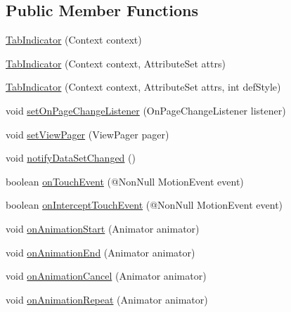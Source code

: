 \subsection*{Public Member Functions}
\begin{DoxyCompactItemize}
\item 
\hyperlink{classcom_1_1material_1_1widget_1_1_tab_indicator_a79d167cd933a28fe4c9d84db81bef555}{Tab\+Indicator} (Context context)
\item 
\hyperlink{classcom_1_1material_1_1widget_1_1_tab_indicator_a9df4c220a5d1449d7ef070029c681665}{Tab\+Indicator} (Context context, Attribute\+Set attrs)
\item 
\hyperlink{classcom_1_1material_1_1widget_1_1_tab_indicator_a82affd69e623c113ea048f669300e191}{Tab\+Indicator} (Context context, Attribute\+Set attrs, int def\+Style)
\item 
void \hyperlink{classcom_1_1material_1_1widget_1_1_tab_indicator_ac80a190723de5eef481d67212a6a258a}{set\+On\+Page\+Change\+Listener} (On\+Page\+Change\+Listener listener)
\item 
void \hyperlink{classcom_1_1material_1_1widget_1_1_tab_indicator_af53aabaef2e37516116aca5ef5a4b345}{set\+View\+Pager} (View\+Pager pager)
\item 
void \hyperlink{classcom_1_1material_1_1widget_1_1_tab_indicator_a8f40e7050e4d7937be0846ca6c120a65}{notify\+Data\+Set\+Changed} ()
\item 
boolean \hyperlink{classcom_1_1material_1_1widget_1_1_tab_indicator_a7d4d07c2660455624b8a6fe89550f4e1}{on\+Touch\+Event} (@Non\+Null Motion\+Event event)
\item 
boolean \hyperlink{classcom_1_1material_1_1widget_1_1_tab_indicator_aaefb7cdc5ae812f11a4894b589f6599e}{on\+Intercept\+Touch\+Event} (@Non\+Null Motion\+Event event)
\item 
void \hyperlink{classcom_1_1material_1_1widget_1_1_tab_indicator_af63262009bacfec9940721c84428e3a8}{on\+Animation\+Start} (Animator animator)
\item 
void \hyperlink{classcom_1_1material_1_1widget_1_1_tab_indicator_adb5e2fe5ccd5719174156183ca0bf792}{on\+Animation\+End} (Animator animator)
\item 
void \hyperlink{classcom_1_1material_1_1widget_1_1_tab_indicator_ae3c36a543d7f1588e7b8dfc5637afe67}{on\+Animation\+Cancel} (Animator animator)
\item 
void \hyperlink{classcom_1_1material_1_1widget_1_1_tab_indicator_a99113f047be034db711b0590973d7ed9}{on\+Animation\+Repeat} (Animator animator)
\end{DoxyCompactItemize}


